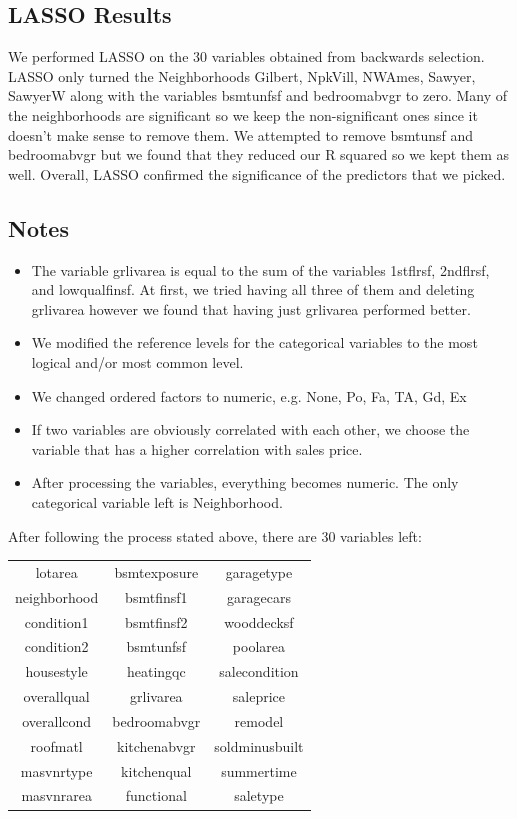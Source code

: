 \documentclass[12pt]{article}
\begin{document}
\begin{flushleft}
\subsection{LASSO Results}
\begin{flushleft}

We performed LASSO on the 30 variables obtained from backwards selection. LASSO only turned the Neighborhoods Gilbert, NpkVill, NWAmes, Sawyer, SawyerW along with the variables bsmtunfsf and bedroomabvgr to zero. Many of the neighborhoods are significant so we keep the non-significant ones since it doesn't make sense to remove them. We attempted to remove bsmtunsf and bedroomabvgr but we found that they reduced our R squared so we kept them as well. Overall, LASSO confirmed the significance of the predictors that we picked.
\end{flushleft}
\subsection{Notes}
\begin{itemize}
\item The variable grlivarea is equal to the sum of the variables 1stflrsf, 2ndflrsf, and lowqualfinsf. At first, we tried having all three of them and deleting grlivarea however we found that having just grlivarea performed better.
\item We modified the reference levels for the categorical variables to the most logical and/or most common level.
\item We changed ordered factors to numeric, e.g. None, Po, Fa, TA, Gd, Ex 
\item If two variables are obviously correlated with each other, we choose the variable that has a higher correlation with sales price.
\item After processing the variables, everything becomes numeric. The only categorical variable left is Neighborhood.
\end{itemize}

After following the process stated above, there are 30 variables left:
\begin{center}
\begin{tabular}{|c|c|c|}
\hline

lotarea & bsmtexposure   &  garagetype \\ neighborhood &  bsmtfinsf1 &    garagecars \\
  condition1  & bsmtfinsf2    & wooddecksf \\
   condition2 &   bsmtunfsf    &   poolarea  \\
   housestyle &   heatingqc & salecondition \\
   overallqual &   grlivarea    & saleprice \\
   overallcond & bedroomabvgr   &     remodel \\
      roofmatl & kitchenabvgr & soldminusbuilt \\
    masvnrtype & kitchenqual  &   summertime \\
   masvnrarea &  functional &       saletype \\  \hline 


\end{tabular}
\end{center}
\end{flushleft}
\end{document}
